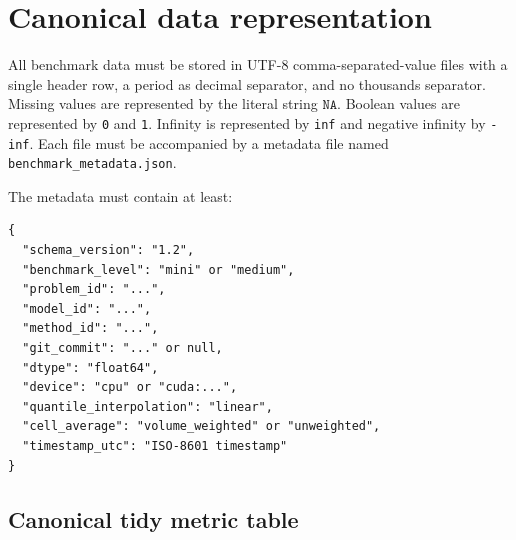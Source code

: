 \documentclass[11pt]{article}
\newcommand{\NA}{\texttt{NA}}
\begin{document}
\section{Canonical data representation}

All benchmark data must be stored in UTF-8 comma-separated-value files with a
single header row, a period as decimal separator, and no thousands separator.
Missing values are represented by the literal string \(\NA\).  Boolean values
are represented by \texttt{0} and \texttt{1}.  Infinity is represented by
\texttt{inf} and negative infinity by \texttt{-inf}.  Each file must be
accompanied by a metadata file named \texttt{benchmark\_metadata.json}.

The metadata must contain at least:
\begin{verbatim}
{
  "schema_version": "1.2",
  "benchmark_level": "mini" or "medium",
  "problem_id": "...",
  "model_id": "...",
  "method_id": "...",
  "git_commit": "..." or null,
  "dtype": "float64",
  "device": "cpu" or "cuda:...",
  "quantile_interpolation": "linear",
  "cell_average": "volume_weighted" or "unweighted",
  "timestamp_utc": "ISO-8601 timestamp"
}
\end{verbatim}

\subsection{Canonical tidy metric table}
\end{document}
